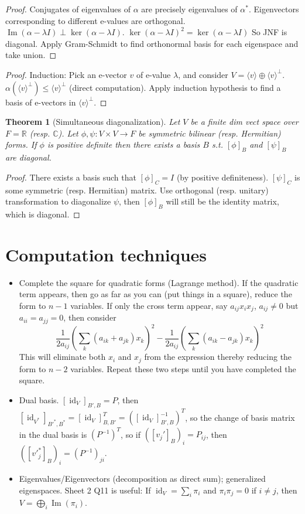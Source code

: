 \documentclass{article}
\theoremstyle{definition}
\theoremstyle{remark}
\theoremstyle{plain}
\newtheorem{thm}[defn]{Theorem}
\newcommand{\RR}{\mathbb{R}}
\newcommand{\CC}{\mathbb{C}}
\begin{document}
\begin{proof}
    Conjugates of eigenvalues of $\alpha$ are precisely eigenvalues of $\alpha^\ast$. 
    Eigenvectors corresponding to different e-values are orthogonal.
    $\operatorname{Im}(\alpha-\lambda I)\perp\ker(\alpha-\lambda I)$.
    $\ker(\alpha-\lambda I)^2=\ker(\alpha-\lambda I)$
    So JNF is diagonal. Apply Gram-Schmidt to find orthonormal basis for each eigenspace and take union.
\end{proof}
\begin{proof}
    Induction: Pick an e-vector $v$ of e-value $\lambda$, and consider $V=\langle v\rangle\oplus\langle v\rangle^\perp$. $\alpha(\langle v\rangle^\perp)\le \langle v\rangle^\perp$ (direct computation). Apply induction hypothesis to find a basis of e-vectors in $\langle v\rangle^\perp$.
\end{proof}
\begin{thm}[Simultaneous diagonalization]
    Let $V$ be a finite dim vect space over $F=\RR$ (resp. $\CC$). Let $\phi,\psi:V\times V\to F$ be symmetric bilinear (resp. Hermitian) forms. If $\phi$ is positive definite then there exists a basis $B$ s.t. $[\phi]_B$ and $[\psi]_B$ are diagonal.
\end{thm}
\begin{proof}
    There exists a basis such that $[\phi]_C=I$ (by positive definiteness). $[\psi]_C$ is some symmetric (resp. Hermitian) matrix.  Use orthogonal (resp. unitary) transformation to diagonalize $\psi$, then $[\phi]_B$ will still be the identity matrix, which is diagonal.
\end{proof}

\section{Computation techniques}
\begin{itemize}
    \item Complete the square for quadratic forms (Lagrange method). If the quadratic term appears, then go as far as you can (put things in a square), reduce the form to $n-1$ variables. If only the cross term appear, say $a_{ij}x_ix_j$, $a_{ij}\neq 0$ but $a_{ii}=a_{jj}=0$, then consider \[\dfrac{1}{2a_{ij}}\left(\sum_k (a_{ik}+a_{jk})x_k\right)^2-\dfrac{1}{2a_{ij}}\left(\sum_{k}(a_{ik}-a_{jk})x_k\right)^2\]
    This will eliminate both $x_i$ and $x_j$ from the expression thereby reducing the form to $n-2$ variables. Repeat these two steps until you have completed the square.
    \item Dual basis. $[\operatorname{id}_V]_{B',B}=P$, then 
    $[\operatorname{id}_{V^\ast}]_{B'^{\ast},B^\ast}=[\operatorname{id}_V]^T_{B,B'}=([\operatorname{id}_V]^{-1}_{B',B})^T$, 
    so the change of basis matrix in the dual basis is $(P^{-1})^T$, so if $([v_j']_{B})_i=P_{ij}$, then $([v'^\ast_j]_{B})_i=(P^{-1})_{ji}$.
    \item Eigenvalues/Eigenvectors (decomposition as direct sum); generalized eigenspaces. Sheet 2 Q11 is useful: If $\operatorname{id}_V=\sum_i\pi_i$ and $\pi_i\pi_j=0$ if $i\neq j$, then $V=\bigoplus_i\operatorname{Im}(\pi_i)$.
\end{itemize}
\end{document}
